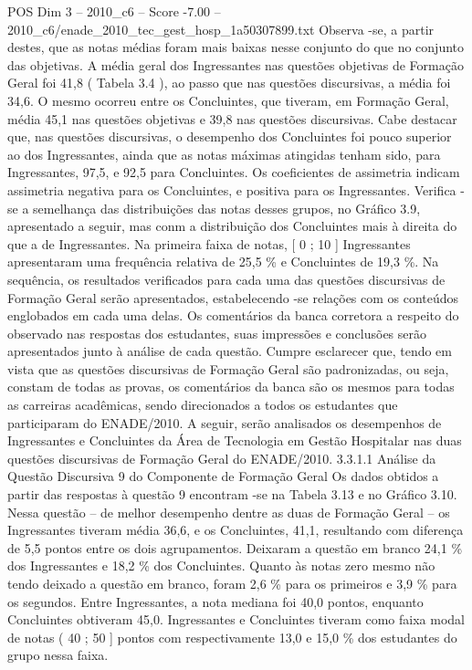 \begin{textsample}{POS Dim 3 – 2010\_c6 – Score -7.00 – 2010\_c6/enade\_2010\_tec\_gest\_hosp\_1a50307899.txt}
Observa -se, a partir destes, que as notas médias foram mais baixas nesse conjunto do que no conjunto das objetivas.
A média geral dos Ingressantes nas questões objetivas de Formação Geral foi 41,8 ( Tabela 3.4 ), ao passo que nas questões discursivas, a média foi 34,6.
O mesmo ocorreu entre os Concluintes, que tiveram, em Formação Geral, média 45,1 nas questões objetivas e 39,8 nas questões discursivas.
Cabe destacar que, nas questões discursivas, o desempenho dos Concluintes foi pouco superior ao dos Ingressantes, ainda que as notas máximas atingidas tenham sido, para Ingressantes, 97,5, e 92,5 para Concluintes.
Os coeficientes de assimetria indicam assimetria negativa para os Concluintes, e positiva para os Ingressantes.
Verifica -se a semelhança das distribuições das notas desses grupos, no Gráfico 3.9, apresentado a seguir, mas conm a distribuição dos Concluintes mais à direita do que a de Ingressantes.
Na primeira faixa de notas, [ 0 ; 10 ] Ingressantes apresentaram uma frequência relativa de 25,5 \% e Concluintes de 19,3 \%.
Na sequência, os resultados verificados para cada uma das questões discursivas de Formação Geral serão apresentados, estabelecendo -se relações com os conteúdos englobados em cada uma delas.
Os comentários da banca corretora a respeito do observado nas respostas dos estudantes, suas impressões e conclusões serão apresentados junto à análise de cada questão.
Cumpre esclarecer que, tendo em vista que as questões discursivas de Formação Geral são padronizadas, ou seja, constam de todas as provas, os comentários da banca são os mesmos para todas as carreiras acadêmicas, sendo direcionados a todos os estudantes que participaram do ENADE/2010.
A seguir, serão analisados os desempenhos de Ingressantes e Concluintes da Área de Tecnologia em Gestão Hospitalar nas duas questões discursivas de Formação Geral do ENADE/2010. 3.3.1.1 Análise da Questão Discursiva 9 do Componente de Formação Geral Os dados obtidos a partir das respostas à questão 9 encontram -se na Tabela 3.13 e no Gráfico 3.10.
Nessa questão – de melhor desempenho dentre as duas de Formação Geral – os Ingressantes tiveram média 36,6, e os Concluintes, 41,1, resultando com diferença de 5,5 pontos entre os dois agrupamentos.
Deixaram a questão em branco 24,1 \% dos Ingressantes e 18,2 \% dos Concluintes.
Quanto às notas zero mesmo não tendo deixado a questão em branco, foram 2,6 \% para os primeiros e 3,9 \% para os segundos.
Entre Ingressantes, a nota mediana foi 40,0 pontos, enquanto Concluintes obtiveram 45,0.
Ingressantes e Concluintes tiveram como faixa modal de notas ( 40 ; 50 ] pontos com respectivamente 13,0 e 15,0 \% dos estudantes do grupo nessa faixa.

\end{textsample}
